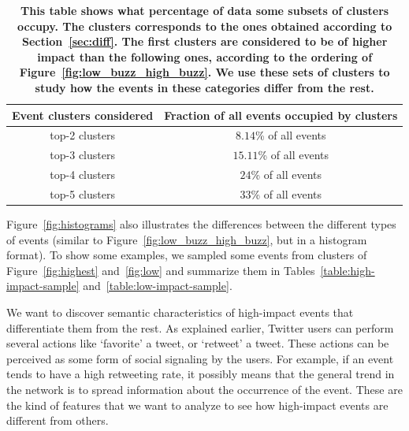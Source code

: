 \documentclass[10pt,letterpaper]{article}
\begin{document}
\begin{table}
  \centering
  {\small
    \begin{tabular}{cc}
      \toprule
      Event clusters considered &  Fraction of all events occupied by clusters\\
      \midrule
      top-2 clusters &  $8.14$\% of all events\\
      top-3 clusters & $15.11$\% of all events \\
      top-4 clusters & $24$\% of all events \\
      top-5 clusters & $33$\% of all events \\
      \bottomrule
    \end{tabular}
  }
  \caption{\textbf{This table shows what percentage of data some
      subsets of clusters occupy. The clusters corresponds to the ones
      obtained according to Section~\ref{sec:diff}. The first clusters
      are considered to be of higher impact than the following ones,
      according to the ordering of Figure~\ref{fig:low_buzz_high_buzz}.
      We use these sets of clusters to study how the events in these
      categories differ from the rest.}} 
  \label{tab:threshold}
\end{table}


Figure~\ref{fig:histograms} also illustrates the differences between
the different types of events (similar to
Figure~\ref{fig:low_buzz_high_buzz}, but in a histogram format). To
show some examples, we sampled some events from clusters of
Figure~\ref{fig:highest} and~\ref{fig:low} and summarize them
in Tables~\ref{table:high-impact-sample}
and~\ref{table:low-impact-sample}.



We want to discover semantic characteristics of high-impact events
that differentiate them from the rest. As explained earlier, Twitter
users can perform several actions like `favorite' a tweet, or
`retweet' a tweet. These actions can be perceived as some form of
social signaling by the users. For example, if an event tends to have
a high retweeting rate, it possibly means that the general trend in
the network is to spread information about the occurrence of the
event. These are the kind of features that we want to analyze to see
how high-impact events are different from others.
\end{document}
